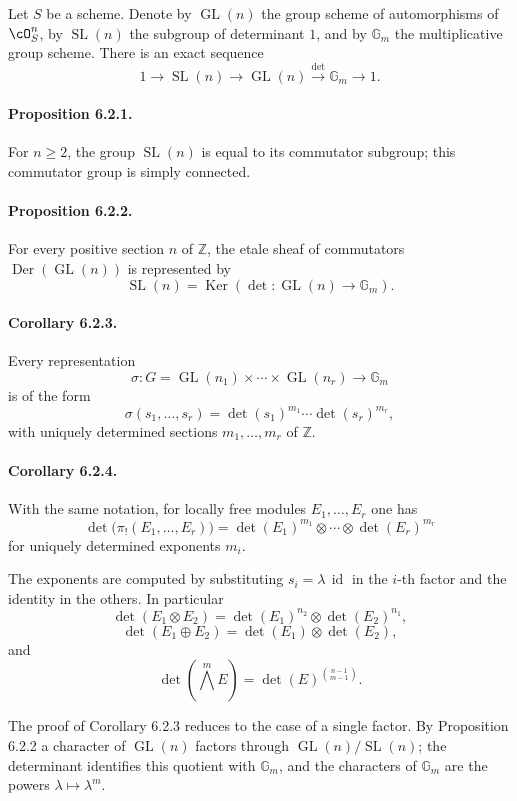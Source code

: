 \documentclass[11pt]{article}
\theoremstyle{plain}
\theoremstyle{definition}
\theoremstyle{remark}
\newcommand{\GG}{\mathbb G}
\newcommand{\ZZ}{\mathbb Z}
\DeclareMathOperator{\Der}{Der}
\DeclareMathOperator{\Ker}{Ker}
\newcommand{\longto}{\longrightarrow}
\providecommand{\xto}[1]{\xrightarrow{#1}}
\providecommand{\Gl}{\operatorname{GL}}
\providecommand{\Sl}{\operatorname{SL}}
\providecommand{\detm}{\operatorname{det}}
\begin{document}
Let $S$ be a scheme. Denote by $\Gl(n)$ the group scheme of automorphisms of $\cO_S^n$, by $\Sl(n)$ the subgroup of determinant $1$, and by $\GG_m$ the multiplicative group scheme. There is an exact sequence
\[
1\longto\Sl(n)\longto\Gl(n)\xto{\detm}\GG_m\longto1.
\]

\paragraph{Proposition 6.2.1.}
For $n\geq2$, the group $\Sl(n)$ is equal to its commutator subgroup; this commutator group is simply connected.

\paragraph{Proposition 6.2.2.}
For every positive section $n$ of $\ZZ$, the etale sheaf of commutators $\Der(\Gl(n))$ is represented by
\[
\Sl(n)=\Ker(\detm:\Gl(n)\to\GG_m).
\]

\paragraph{Corollary 6.2.3.}
Every representation
\[
\sigma:G=\Gl(n_1)\times\cdots\times\Gl(n_r)\longto\GG_m
\]
is of the form
\[
\sigma(s_1,\ldots,s_r)=\detm(s_1)^{m_1}\cdots\detm(s_r)^{m_r},
\]
with uniquely determined sections $m_1,\ldots,m_r$ of $\ZZ$.

\paragraph{Corollary 6.2.4.}
With the same notation, for locally free modules $E_1,\ldots,E_r$ one has
\[
\detm\bigl(\pi_!(E_1,\ldots,E_r)\bigr)=
\detm(E_1)^{m_1}\otimes\cdots\otimes\detm(E_r)^{m_r}
\]
for uniquely determined exponents $m_i$.

The exponents are computed by substituting $s_i=\lambda\,\operatorname{id}$ in the $i$-th factor and the identity in the others. In particular
\[
\detm(E_1\otimes E_2)=\detm(E_1)^{n_2}\otimes\detm(E_2)^{n_1},
\]
\[
\detm(E_1\oplus E_2)=\detm(E_1)\otimes\detm(E_2),
\]
and
\[
\detm(\bigwedge^m E)=\detm(E)^{{n-1\choose m-1}}.
\]

The proof of Corollary 6.2.3 reduces to the case of a single factor. By Proposition 6.2.2 a character of $\Gl(n)$ factors through $\Gl(n)/\Sl(n)$; the determinant identifies this quotient with $\GG_m$, and the characters of $\GG_m$ are the powers $\lambda\mapsto\lambda^m$.
\end{document}
